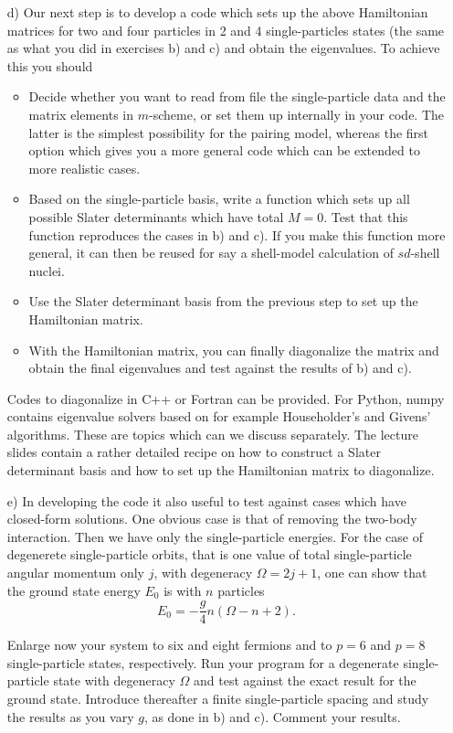 \documentclass[prc]{revtex4}
\begin{document}
\begin{enumerate}
\item[d)]  Our next step is to develop a code which sets up the above Hamiltonian matrices for two and four particles in 2 and 4 single-particles states (the same as what you did in exercises b) and c) and obtain the eigenvalues.
To achieve this you should
\begin{itemize}
\item Decide whether you want to read from file the single-particle data and the matrix elements in $m$-scheme, or set them up internally in your code.
The latter is the simplest possibility for the pairing model, whereas the first option which gives you a more general code which can be extended to more realistic cases. 
\item Based on the single-particle basis, write a function which sets up all possible Slater determinants which have total $M=0$. 
Test that this function  reproduces the cases in b) and c). If you make this function more general, it can then be reused for say a shell-model
calculation of $sd$-shell nuclei.
\item Use the Slater determinant basis from the previous step to set up the Hamiltonian matrix.
\item With the Hamiltonian matrix, you can finally diagonalize the matrix and obtain the final eigenvalues and test against the results of b) and c).
\end{itemize}
Codes to diagonalize in C++ or Fortran can be provided. For Python, numpy contains eigenvalue solvers based on for example Householder's and Givens' algorithms.   These are topics which can we discuss separately. The lecture slides contain a rather detailed recipe
on how to construct a Slater determinant basis and how to set up the Hamiltonian matrix to diagonalize.

\item[e)]
In developing the code it also useful to test against cases which have closed-form solutions. One obvious case is that of removing the 
two-body interaction. Then we have only the single-particle energies.
For the case of degenerete single-particle orbits, that is one value of total single-particle angular momentum only $j$, with degeneracy $\Omega=2j+1$, one can show that the ground state energy $E_0$ is with $n$ particles 
\[
E_0= -\frac{g}{4}n\left(\Omega-n+2\right).
\]

Enlarge now your system to six and eight fermions and to $p=6$ and $p=8$ single-particle states, respectively. Run your program for a degenerate single-particle state with degeneracy $\Omega$ and test
against the exact result for the ground state. Introduce thereafter a finite single-particle spacing and study the results as you vary $g$,  as done in b) and c). Comment your results. 
\end{enumerate}
\end{document}
